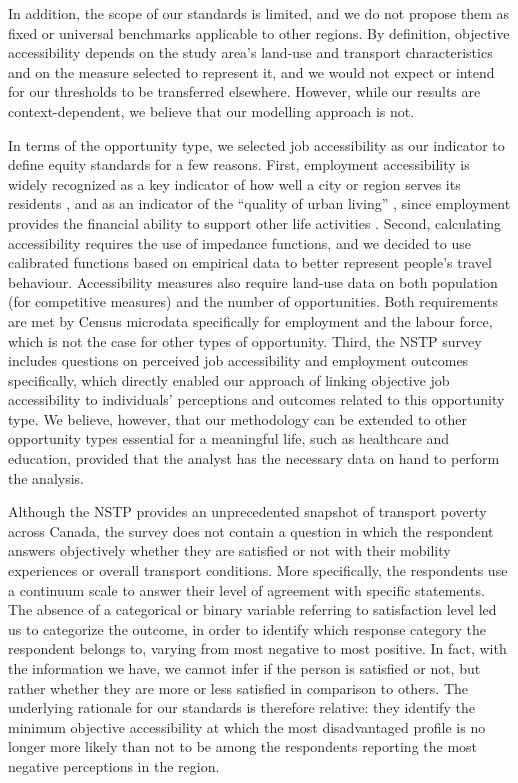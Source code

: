 \documentclass[preprint, 3p,
authoryear]{elsarticle} %
\begin{document}
In addition, the scope of our standards is limited, and we do not
propose them as fixed or universal benchmarks applicable to other
regions. By definition, objective accessibility depends on the study
area's land-use and transport characteristics and on the measure
selected to represent it, and we would not expect or intend for our
thresholds to be transferred elsewhere. However, while our results are
context-dependent, we believe that our modelling approach is not.

In terms of the opportunity type, we selected job accessibility as our
indicator to define equity standards for a few reasons. First,
employment accessibility is widely recognized as a key indicator of how
well a city or region serves its residents
\citep{bania2008, owen2015, shen1998}, and as an indicator of the
``quality of urban living'' \citep{wachs1973, handy2020}, since
employment provides the financial ability to support other life
activities \citep{merlin2017}. Second, calculating accessibility
requires the use of impedance functions, and we decided to use
calibrated functions based on empirical data to better represent
people's travel behaviour. Accessibility measures also require land-use
data on both population (for competitive measures) and the number of
opportunities. Both requirements are met by Census microdata
specifically for employment and the labour force, which is not the case
for other types of opportunity. Third, the NSTP survey includes
questions on perceived job accessibility and employment outcomes
specifically, which directly enabled our approach of linking objective
job accessibility to individuals' perceptions and outcomes related to
this opportunity type. We believe, however, that our methodology can be
extended to other opportunity types essential for a meaningful life,
such as healthcare and education, provided that the analyst has the
necessary data on hand to perform the analysis.

Although the NSTP provides an unprecedented snapshot of transport
poverty across Canada, the survey does not contain a question in which
the respondent answers objectively whether they are satisfied or not
with their mobility experiences or overall transport conditions. More
specifically, the respondents use a continuum scale to answer their
level of agreement with specific statements. The absence of a
categorical or binary variable referring to satisfaction level led us to
categorize the outcome, in order to identify which response category the
respondent belongs to, varying from most negative to most positive. In
fact, with the information we have, we cannot infer if the person is
satisfied or not, but rather whether they are more or less satisfied in
comparison to others. The underlying rationale for our standards is
therefore relative: they identify the minimum objective accessibility at
which the most disadvantaged profile is no longer more likely than not
to be among the respondents reporting the most negative perceptions in
the region.
\end{document}
